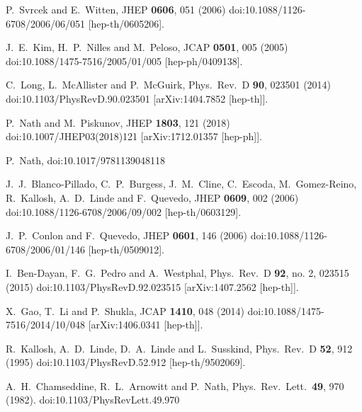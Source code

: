 \documentclass[12pt]{article}
\begin{document}
\begin{thebibliography}{99}
  P.~Svrcek and E.~Witten,
  JHEP {\bf 0606}, 051 (2006)
  doi:10.1088/1126-6708/2006/06/051
  [hep-th/0605206].

  J.~E.~Kim, H.~P.~Nilles and M.~Peloso,
  JCAP {\bf 0501}, 005 (2005)
  doi:10.1088/1475-7516/2005/01/005
  [hep-ph/0409138].

  C.~Long, L.~McAllister and P.~McGuirk,
  Phys.\ Rev.\ D {\bf 90}, 023501 (2014)
  doi:10.1103/PhysRevD.90.023501
  [arXiv:1404.7852 [hep-th]].

  P.~Nath and M.~Piskunov,
  JHEP {\bf 1803}, 121 (2018)
  doi:10.1007/JHEP03(2018)121
  [arXiv:1712.01357 [hep-ph]].

  P.~Nath,
  doi:10.1017/9781139048118

  J.~J.~Blanco-Pillado, C.~P.~Burgess, J.~M.~Cline, C.~Escoda, M.~Gomez-Reino, R.~Kallosh, A.~D.~Linde and F.~Quevedo,
  JHEP {\bf 0609}, 002 (2006)
  doi:10.1088/1126-6708/2006/09/002
  [hep-th/0603129].

  J.~P.~Conlon and F.~Quevedo,
  JHEP {\bf 0601}, 146 (2006)
  doi:10.1088/1126-6708/2006/01/146
  [hep-th/0509012].

  I.~Ben-Dayan, F.~G.~Pedro and A.~Westphal,
  Phys.\ Rev.\ D {\bf 92}, no. 2, 023515 (2015)
  doi:10.1103/PhysRevD.92.023515
  [arXiv:1407.2562 [hep-th]].

  X.~Gao, T.~Li and P.~Shukla,
  JCAP {\bf 1410}, 048 (2014)
  doi:10.1088/1475-7516/2014/10/048
  [arXiv:1406.0341 [hep-th]].

  R.~Kallosh, A.~D.~Linde, D.~A.~Linde and L.~Susskind,
  Phys.\ Rev.\ D {\bf 52}, 912 (1995)
  doi:10.1103/PhysRevD.52.912
  [hep-th/9502069].

  A.~H.~Chamseddine, R.~L.~Arnowitt and P.~Nath,
  Phys.\ Rev.\ Lett.\  {\bf 49}, 970 (1982).
  doi:10.1103/PhysRevLett.49.970


\end{thebibliography}
\end{document}
